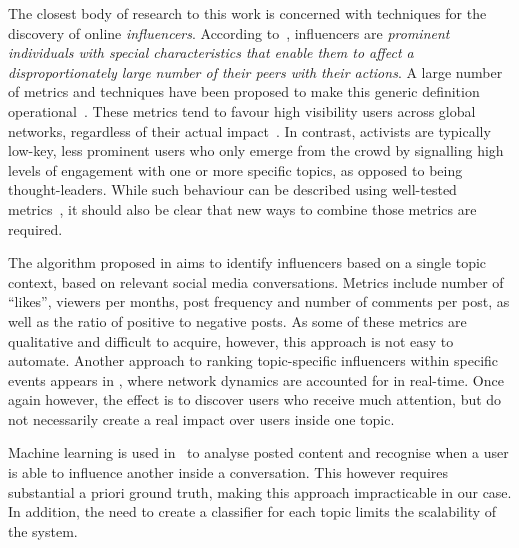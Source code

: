 

The closest body of research to this work is concerned with techniques for the discovery of online \textit{influencers}. 
According to~\cite{Kardara2015}, influencers are \textit{prominent individuals with special characteristics that enable them to	affect a disproportionately large number of their peers with their actions}.
%
A large number of metrics and techniques have been proposed to make this generic definition operational~\cite{RIQUELME2016949}. 
%
These metrics tend to favour high visibility users across global networks, regardless of their actual impact~\cite{Cha2010MeasuringUI}. 
%
In contrast, activists are typically low-key, less prominent users who only emerge from the crowd by signalling high levels of engagement with one or more specific topics, as opposed to being thought-leaders. 
%
While such behaviour can be described  using well-tested metrics~\cite{RIQUELME2016949}, it should also be clear that new ways to combine those metrics are required.

The algorithm proposed in \cite{MATIC2011} aims to identify influencers based on a single topic context, based on relevant social media conversations.
Metrics include number of ``likes'', viewers per months, post frequency and  number of comments per post, as well as the ratio of positive to negative posts.
As some of these metrics are qualitative and difficult to acquire, however, this approach is not easy to automate.
%
Another approach to ranking topic-specific influencers within specific events appears in  \cite{Kardara2015}, where network dynamics are accounted for in real-time.
Once again however, the effect is to discover users who receive much attention, but do not necessarily create a real impact over users inside one topic.

Machine learning is used in~\cite{Biran2012} to analyse posted content and recognise when a user is able to influence another  inside a conversation.
This however requires substantial a priori ground truth, making this approach impracticable in our case. In addition, the need to create a classifier for each topic limits the scalability of the system.

	
